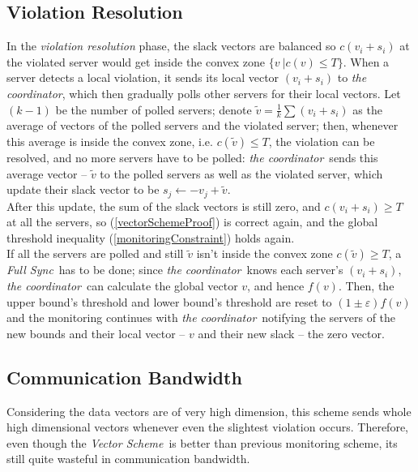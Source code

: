 \documentclass[10pt, conference]{IEEEtran}
\newcommand{\vectorScheme}{\textit{Vector Scheme}}
\newcommand{\fullSync}{\textit{Full Sync}}
\newcommand{\theCoordinator}{\textit{the coordinator}}
\begin{document}
\subsection{Violation Resolution}
In the \textit{violation resolution} phase, the slack vectors are balanced so ${c(v_i+s_i)}$ at the violated server would get inside the convex zone ${\{v \ | c(v) \leq T\}}$. When a server detects a local violation, it sends its local vector ${(v_i + s_i)}$ to \theCoordinator , which then gradually polls other servers for their local vectors. Let ${(k-1)}$ be the number of polled servers; denote ${\widetilde{v} = \frac{1}{k}\sum (v_i + s_i)}$ as the average of vectors of the polled servers and the violated server; then, whenever this average is inside the convex zone, i.e. ${c(\widetilde{v}) \leq T}$, the violation can be resolved, and no more servers have to be polled: \theCoordinator \ sends this average vector -- ${\widetilde{v}}$ to the polled servers as well as the violated server, which update their slack vector to be ${s_j \leftarrow -v_j + \widetilde{v}}$. \\
After this update, the sum of the slack vectors is still zero, and ${c(v_i+s_i) \geq T}$ at all the servers, so (\ref{vectorSchemeProof}) is correct again, and the global threshold inequality (\ref{monitoringConstraint}) holds again. \\
If all the servers are polled and still ${\widetilde{v}}$ isn't inside the convex zone ${c(\widetilde{v}) \geq T}$, a \fullSync \ has to be done; since \theCoordinator \ knows each server's ${(v_i + s_i)}$, \theCoordinator \ can calculate the global vector $v$, and hence $f(v)$. Then, the upper bound's threshold and lower bound's threshold are reset to ${(1 \pm \varepsilon )f(v)}$ and the monitoring continues with \theCoordinator \ notifying the servers of the new bounds and their local vector -- $v$ and their new slack -- the zero vector.
\subsection{Communication Bandwidth}
Considering the data vectors are of very high dimension, this scheme sends whole high dimensional vectors whenever even the slightest violation occurs. Therefore, even though the \vectorScheme \  is better than previous monitoring scheme, its still quite wasteful in communication bandwidth.

\end{document}
